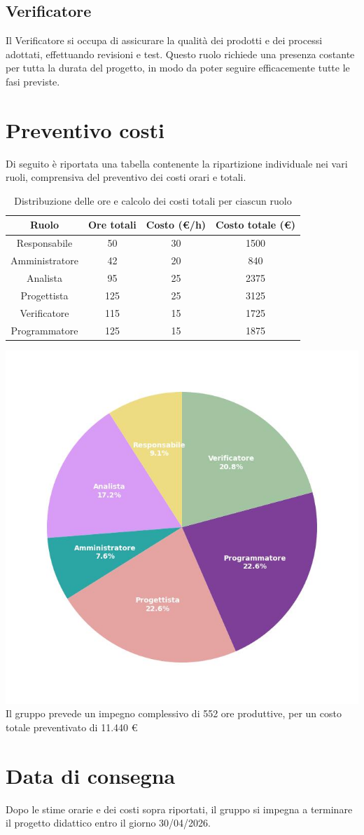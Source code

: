 \documentclass{article}
\begin{document}
	\subsection{Verificatore}
	Il Verificatore si occupa di assicurare la qualità dei prodotti e dei processi adottati, effettuando revisioni e test. 
	Questo ruolo richiede una presenza costante per tutta la durata del progetto, in modo da poter seguire efficacemente tutte le fasi previste.
	
	\section{Preventivo costi}
	Di seguito è riportata una tabella contenente la ripartizione individuale nei vari ruoli, comprensiva del preventivo dei costi orari e totali.
	\begin{table}[h!]
		\centering
		\begin{tabular}{|c|c|c|c|}
			\hline
			\rowcolor{gray!25}
			Ruolo & Ore totali & Costo (€/h) & Costo totale (€) \\ \hline
			Responsabile & 50 & 30 & 1500 \\ \hline
			Amministratore & 42 & 20 & 840 \\ \hline
			Analista & 95 & 25 & 2375 \\ \hline
			Progettista & 125 & 25 & 3125 \\ \hline
			Verificatore & 115 & 15 & 1725 \\ \hline
			Programmatore & 125 & 15 & 1875 \\ \hline
		\end{tabular}
		\caption{Distribuzione delle ore e calcolo dei costi totali per ciascun ruolo}
	\end{table}
	
	\FloatBarrier
	\includegraphics[width=1.0\textwidth]{grafico_costi.jpeg}
	Il gruppo prevede un impegno complessivo di 552 ore produttive, per un costo totale preventivato di 11.440 €
	
	\section{Data di consegna}
	Dopo le stime orarie e dei costi sopra riportati, il gruppo si impegna a terminare il progetto didattico entro il giorno 30/04/2026.

	
	
	
\end{document}
